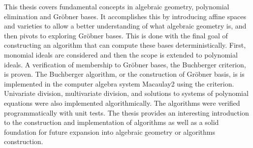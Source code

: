 This thesis covers fundamental concepts in algebraic geometry, polynomial elimination and Gröbner bases. It accomplishes this by introducing affine spaces and varieties to allow a better understanding of what algebraic geometry is, and then pivots to exploring Gröbner bases. This is done with the final goal of constructing an algorithm that can compute these bases deterministically. First, monomial ideals are considered and then the scope is extended to polynomial ideals. A verification of membership to Gröbner bases, the Buchberger criterion, is proven. The Buchberger algorithm, or the construction of Gröbner basis, is is implemented in the computer algebra system Macaulay2 using the criterion. Univariate division, multivariate division, and solutions to systems of polynomial equations were also implemented algorithmically. The algorithms were verified programmatically with unit tests. The thesis provides an interesting introduction to the construction and implementation of algorithms as well as a solid foundation for future expansion into algebraic geometry or algorithms construction. 
